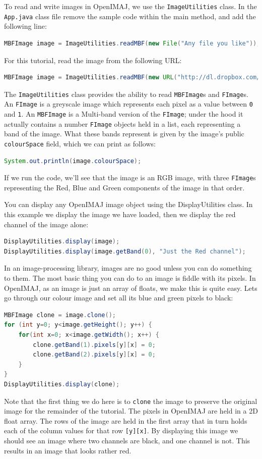 \documentclass[10pt,a4paper,twoside,extrafontsizes]{memoir}
\begin{document}
To read and write images in OpenIMAJ, we use the \verb+ImageUtilities+ class. In the \verb+App.java+ 
class file remove the sample code within the main method, and add the following line:
\begin{lstlisting}[language=java]
MBFImage image = ImageUtilities.readMBF(new File("Any file you like"));
\end{lstlisting}
For this tutorial, read the image from the following URL:
\begin{lstlisting}[language=java]
MBFImage image = ImageUtilities.readMBF(new URL("http://dl.dropbox.com/u/8705593/sinaface.jpg"));
\end{lstlisting}
The \verb+ImageUtilities+ class provides the ability to read \verb+MBFImage+s and \verb+FImage+s. 
An \verb+FImage+ is a greyscale image which represents each pixel as a value between \verb+0+ and 
\verb+1+. An \verb+MBFImage+ is a Multi-band version of the \verb+FImage+; under the hood it actually
contains a number \verb+FImage+ objects held in a list, each representing a band of the image. 
What these bands represent is given by the image's public \verb+colourSpace+ field, which we 
can print as follows:
\begin{lstlisting}[language=java]
System.out.println(image.colourSpace);
\end{lstlisting}
If we run the code, we'll see that the image is an RGB image, with three \verb+FImage+s representing 
the Red, Blue and Green components of the image in that order.

You can display any OpenIMAJ image object using the DisplayUtilities class. In this example we display
the image we have loaded, then we display the red channel of the image alone:
\begin{lstlisting}[language=java]
DisplayUtilities.display(image);
DisplayUtilities.display(image.getBand(0), "Just the Red channel");
\end{lstlisting}

In an image-processing library, images are no good unless you can do something to them. The most basic 
thing you can do to an image is fiddle with its pixels. In OpenIMAJ, as an image is just an array of 
floats, we make this is quite easy. Lets go through our colour image and set all its blue and green 
pixels to black:
\begin{lstlisting}[language=java]
MBFImage clone = image.clone();
for (int y=0; y<image.getHeight(); y++) {
    for(int x=0; x<image.getWidth(); x++) {
        clone.getBand(1).pixels[y][x] = 0;
        clone.getBand(2).pixels[y][x] = 0;
    }
}
DisplayUtilities.display(clone);
\end{lstlisting}
Note that the first thing we do here is to \verb+clone+ the image to preserve the original image
for the remainder of the tutorial. The pixels in OpenIMAJ are held in a 2D float array. The rows 
of the image are held in the first array that in turn holds each of the column values for that 
row \verb+[y][x]+. By displaying this image we should see an image where two channels are black, 
and one channel is not. This results in an image that looks rather red.
\end{document}
